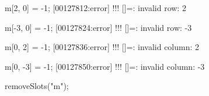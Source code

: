 \begin{urbiscriptapi}
\begin{urbiscript}
m[2, 0] = -1;
[00127812:error] !!! []=: invalid row: 2

m[-3, 0] = -1;
[00127824:error] !!! []=: invalid row: -3

m[0, 2] = -1;
[00127836:error] !!! []=: invalid column: 2

m[0, -3] = -1;
[00127850:error] !!! []=: invalid column: -3
\end{urbiscript}
\begin{urbicomment}
  removeSlots("m");
\end{urbicomment}

\end{urbiscriptapi}

